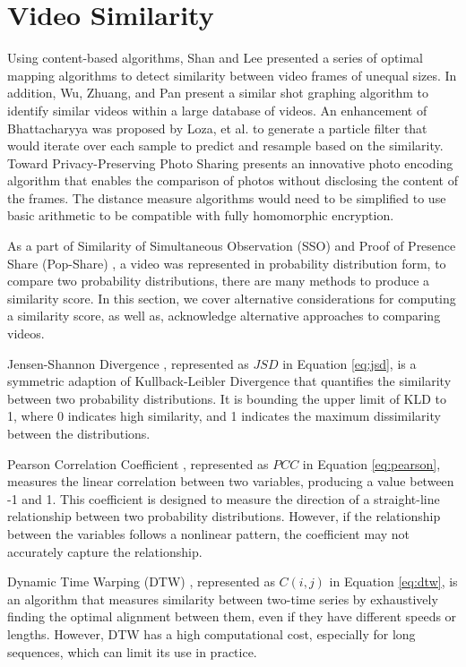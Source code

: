 \section{Video Similarity}
\label{sec:Related Video Similarity}
Using content-based algorithms, Shan and Lee \cite{Shan2002-sfs} presented a series of optimal mapping algorithms to detect similarity between video frames of unequal sizes. In addition, Wu, Zhuang, and Pan \cite{Wu2000-nf} present a similar shot graphing algorithm to identify similar videos within a large database of videos. An enhancement of Bhattacharyya was proposed by Loza, et al. \cite{Loza2006-sso} to generate a particle filter that would iterate over each sample to predict and resample based on the similarity. Toward Privacy-Preserving Photo Sharing \cite{Ra2013-p3} presents an innovative photo encoding algorithm that enables the comparison of photos without disclosing the content of the frames. The distance measure algorithms would need to be simplified to use basic arithmetic to be compatible with fully homomorphic encryption.

As a part of Similarity of Simultaneous Observation (SSO) \cite{Wu2019-SSO} and Proof of Presence Share (Pop-Share) \cite{Lagesse2021-PopShare}, a video was represented in probability distribution form, to compare two probability distributions, there are many methods to produce a similarity score. In this section, we cover alternative considerations for computing a similarity score, as well as, acknowledge alternative approaches to comparing videos.

Jensen-Shannon Divergence \cite{Lin1991-jsd}, represented as $JSD$ in Equation \ref{eq:jsd}, is a symmetric adaption of Kullback-Leibler Divergence that quantifies the similarity between two probability distributions. It is bounding the upper limit of KLD to 1, where 0 indicates high similarity, and 1 indicates the maximum dissimilarity between the distributions.



Pearson Correlation Coefficient \cite{Pearson1896-hp}, represented as $PCC$ in Equation \ref{eq:pearson}, measures the linear correlation between two variables, producing a value between -1 and 1. This coefficient is designed to measure the direction of a straight-line relationship between two probability distributions. However, if the relationship between the variables follows a nonlinear pattern, the coefficient may not accurately capture the relationship.



Dynamic Time Warping (DTW) \cite{Sakoe1978-dtw}, represented as $C(i,j)$ in Equation \ref{eq:dtw}, is an algorithm that measures similarity between two-time series by exhaustively finding the optimal alignment between them, even if they have different speeds or lengths. However, DTW has a high computational cost, especially for long sequences, which can limit its use in practice. 


